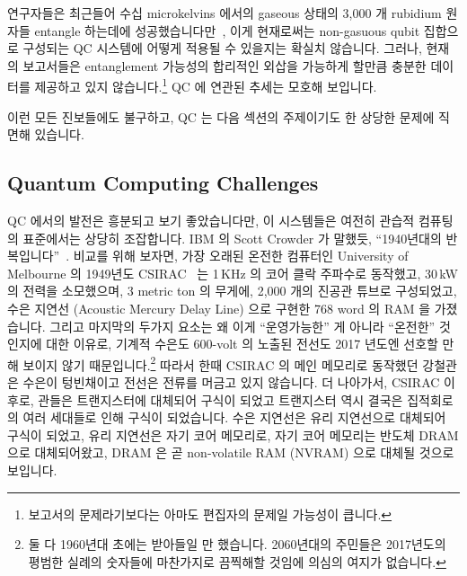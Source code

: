 연구자들은 최근들어 수십 microkelvins 에서의 gaseous 상태의 3,000 개 rubidium
원자들 entangle 하는데에
성공했습니다만~\cite{RobertMcConnell2015QC-Entangle3000Atoms}, 이게 현재로써는
non-gasuous qubit 집합으로 구성되는 QC 시스템에 어떻게 적용될 수 있을지는
확실치 않습니다.
그러나, 현재의 보고서들은 entanglement 가능성의 합리적인 외삽을 가능하게 할만큼
충분한 데이터를 제공하고 있지 않습니다.\footnote{
	보고서의 문제라기보다는 아마도 편집자의 문제일 가능성이 큽니다.}
QC 에 연관된 추세는 모호해 보입니다.

이런 모든 진보들에도 불구하고, QC 는 다음 섹션의 주제이기도 한 상당한 문제에
직면해 있습니다.

\subsection{Quantum Computing Challenges}
\label{sec:future:Quantum Computing Challenges}

QC 에서의 발전은 흥분되고 보기 좋았습니다만, 이 시스템들은 여전히 관습적
컴퓨팅의 표준에서는 상당히 조잡합니다.
IBM 의 Scott Crowder 가 말했듯, ``1940년대의
반복입니다''~\cite{BradJones2017IBM-QC-Crowder}.
비교를 위해 보자면, 가장 오래된 온전한 컴퓨터인 University of Melbourne 의
1949년도 CSIRAC~\cite{CSIRACMuseumVictoria,CSIRACUniversityMelbourne} 는 1\,KHz
의 코어 클락 주파수로 동작했고, 30\,kW 의 전력을 소모했으며, 3 metric ton 의
무게에, 2,000 개의 진공관 튜브로 구성되었고, 수은 지연선 (Acoustic Mercury
Delay Line) 으로 구현한 768 word 의 RAM 을 가졌습니다.
그리고 마지막의 두가지 요소는 왜 이게 ``운영가능한'' 게 아니라 ``온전한''
것인지에 대한 이유로, 기계적 수은도 600-volt 의 노출된 전선도 2017 년도엔
선호할 만해 보이지 않기 때문입니다.\footnote{
	둘 다 1960년대 초에는 받아들일 만 했습니다.
	2060년대의 주민들은 2017년도의 평범한 실례의 숫자들에 마찬가지로
	끔찍해할 것임에 의심의 여지가 없습니다.}
따라서 한때 CSIRAC 의 메인 메모리로 동작했던 강철관은 수은이 텅빈채이고 전선은
전류를 머금고 있지 않습니다.
더 나아가서, CSIRAC 이후로, 관들은 트랜지스터에 대체되어 구식이 되었고
트랜지스터 역시 결국은 집적회로의 여러 세대들로 인해 구식이 되었습니다.
수은 지연선은 유리 지연선으로 대체되어 구식이 되었고, 유리 지연선은 자기 코어
메모리로, 자기 코어 메모리는 반도체 DRAM 으로 대체되어왔고, DRAM 은 곧
non-volatile RAM (NVRAM) 으로 대체될 것으로 보입니다.
\iffalse


